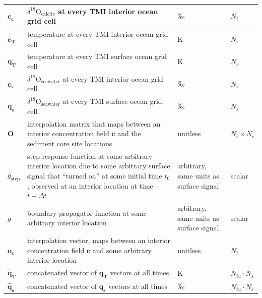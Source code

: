 \documentclass[draft]{agujournal2019}
\begin{document}
\begin{longtable}{| p{0.75in}|p{3.5in}|p{1in}|p{1in} |}
  \hline
  $\mathbf{c_{c}}$ & $\delta^{18}\mathrm{O}_{\mathrm{calcite}}$ at every TMI interior ocean grid cell & $\permil$ & $N_i$ \\
  \hline
  $\mathbf{c_{T}}$ & temperature at every TMI interior ocean grid cell & K & $N_{i}$ \\
  \hline
  $\mathbf{q_{T}}$ & temperature at every TMI surface ocean grid cell & K & $N_{s}$ \\
  \hline
  $\mathbf{c_{s}}$ & $\delta^{18}\mathrm{O}_{\mathrm{seawater}}$ at every TMI interior ocean grid cell & $\permil$ & $N_{i}$ \\
  \hline
  $\mathbf{q_{s}}$ & $\delta^{18}\mathrm{O}_{\mathrm{seawater}}$ at every TMI surface ocean grid cell & $\permil$ & $N_{s}$ \\
  \hline
  $\mathbf{O}$ & interpolation matrix that maps between an interior concentration field $\mathbf{c}$ and the sediment core site locations & unitless & $N_{i} \times N_{c}$\\ 
  \hline
  $g_{\mathrm{step}}$ & step response function at some arbitrary interior location due to some arbitrary surface signal that ``turned on'' at some initial time $t_{0}$, observed at an interior location at time $t+\Delta t$ & arbitrary, same units as surface signal & scalar \\
  \hline
  $g$ & boundary propagator function at some arbitrary interior location & arbitrary, same units as surface signal & scalar \\
  \hline
  $\mathbf{o_{c}}$ & interpolation vector, maps between an interior concentration field $\mathbf{c}$ and some arbitrary interior location & unitless & $N_{i}$ \\
  \hline
  $\mathbf{\hat{q}_{T}}$ & concatenated vector of $\mathbf{q_{T}}$ vectors at all times & K & $N_{tu} \cdot N_{s}$ \\
  \hline
  $\mathbf{\hat{q}_{s}}$ & concatenated vector of $\mathbf{q_{s}}$ vectors at all times & $\permil$ & $N_{tu} \cdot N_{s}$ \\
  

\end{longtable}
\end{document}
